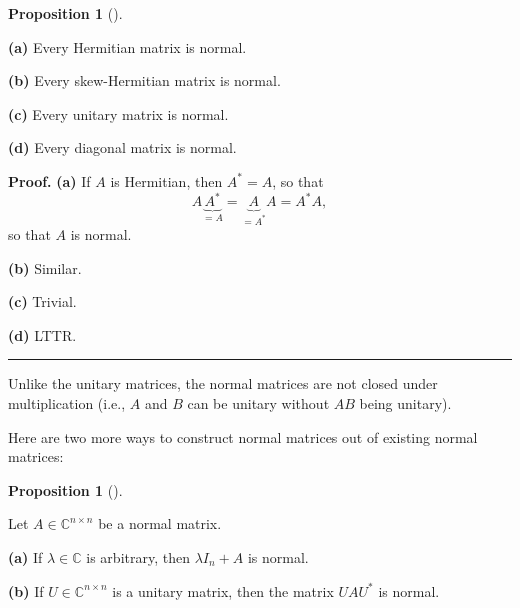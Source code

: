\documentclass[numbers=enddot,12pt,final,onecolumn,notitlepage]{scrartcl}%
\numberwithin{exer}{subsection}
\theoremstyle{definition}
\newtheorem{prop}[theo]{Proposition}
\newenvironment{proposition}[1][]
{\begin{prop}[#1]\begin{leftbar}}
{\end{leftbar}\end{prop}}
\newenvironment{proof}[1][Proof]{\noindent\textbf{#1.} }{\ \rule{0.5em}{0.5em}}
\begin{document}
\begin{proposition}
\textbf{(a)} Every Hermitian matrix is normal.

\textbf{(b)} Every skew-Hermitian matrix is normal.

\textbf{(c)} Every unitary matrix is normal.

\textbf{(d)} Every diagonal matrix is normal.
\end{proposition}

\begin{proof}
\textbf{(a)} If $A$ is Hermitian, then $A^{\ast}=A$, so that%
\[
A\underbrace{A^{\ast}}_{=A}=\underbrace{A}_{=A^{\ast}}A=A^{\ast}A,
\]
so that $A$ is normal.

\textbf{(b)} Similar.

\textbf{(c)} Trivial.

\textbf{(d)} LTTR.
\end{proof}

Unlike the unitary matrices, the normal matrices are not closed under
multiplication (i.e., $A$ and $B$ can be unitary without $AB$ being unitary).

Here are two more ways to construct normal matrices out of existing normal matrices:

\begin{proposition}
Let $A\in\mathbb{C}^{n\times n}$ be a normal matrix.

\textbf{(a)} If $\lambda\in\mathbb{C}$ is arbitrary, then $\lambda I_{n}+A$ is normal.

\textbf{(b)} If $U\in\mathbb{C}^{n\times n}$ is a unitary matrix, then the
matrix $UAU^{\ast}$ is normal.
\end{proposition}
\end{document}
